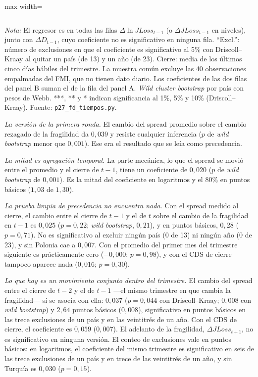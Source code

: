 \begin{table}[htbp]
\begin{adjustbox}{max width=\linewidth}
\begin{tabular}{l cccc cccc}
\bottomrule
\end{tabular}
\end{adjustbox}
\par\smallskip\parbox{0.95\linewidth}{\footnotesize \textit{Nota:} El regresor es en todas las filas $\Delta\ln JLoss_{t-1}$ (o $\Delta JLoss_{t-1}$ en niveles), junto con $\Delta D_{t-1}$, cuyo coeficiente no es significativo en ninguna fila. ``Excl.'': número de exclusiones en que el coeficiente es significativo al 5\% con Driscoll--Kraay al quitar un país (de 13) y un año (de 23). Cierre: media de los últimos cinco días hábiles del trimestre. La muestra común excluye las 40 observaciones empalmadas del FMI, que no tienen dato diario. Los coeficientes de las dos filas del panel B suman el de la fila del panel A. \textit{Wild cluster bootstrap} por país con pesos de Webb. ***, ** y * indican significancia al 1\%, 5\% y 10\% (Driscoll--Kraay). Fuente: \texttt{p27\_fd\_tiempos.py}.}
\end{table}

\emph{La versión de la primera ronda.} El cambio del spread promedio sobre el cambio rezagado de la fragilidad da $0{,}039$ y resiste cualquier inferencia ($p$ de \textit{wild bootstrap} menor que $0{,}001$). Ese era el resultado que se leía como precedencia.

\emph{La mitad es agregación temporal.} La parte mecánica, lo que el spread se movió entre el promedio y el cierre de $t-1$, tiene un coeficiente de $0{,}020$ ($p$ de \textit{wild bootstrap} de $0{,}001$). Es la mitad del coeficiente en logaritmos y el 80\% en puntos básicos ($1{,}03$ de $1{,}30$).

\emph{La prueba limpia de precedencia no encuentra nada.} Con el spread medido al cierre, el cambio entre el cierre de $t-1$ y el de $t$ sobre el cambio de la fragilidad en $t-1$ es $0{,}025$ ($p=0{,}22$; \textit{wild bootstrap}, $0{,}21$), y en puntos básicos, $0{,}28$ ($p=0{,}71$). No es significativo al excluir ningún país (0 de 13) ni ningún año (0 de 23), y sin Polonia cae a $0{,}007$. Con el promedio del primer mes del trimestre siguiente es prácticamente cero ($-0{,}000$; $p=0{,}98$), y con el CDS de cierre tampoco aparece nada ($0{,}016$; $p=0{,}30$).

\emph{Lo que hay es un movimiento conjunto dentro del trimestre.} El cambio del spread entre el cierre de $t-2$ y el de $t-1$ ---el mismo trimestre en que cambia la fragilidad--- sí se asocia con ella: $0{,}037$ ($p=0{,}044$ con Driscoll--Kraay; $0{,}008$ con \textit{wild bootstrap}) y $2{,}64$ puntos básicos ($0{,}008$), significativo en puntos básicos en las trece exclusiones de un país y en las veintitrés de un año. Con el CDS de cierre, el coeficiente es $0{,}059$ ($0{,}007$). El adelanto de la fragilidad, $\Delta JLoss_{t+1}$, no es significativo en ninguna versión. El conteo de exclusiones vale en puntos básicos: en logaritmos, el coeficiente del mismo trimestre es significativo en seis de las trece exclusiones de un país y en trece de las veintitrés de un año, y sin Turquía es $0{,}030$ ($p=0{,}15$).

